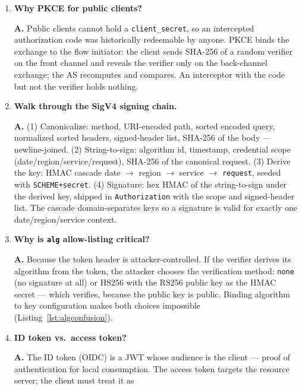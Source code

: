 \begin{enumerate}[label=\textbf{Q\arabic*.}, leftmargin=1.7cm, itemsep=0.9em, start=11]
  \item \textbf{Why PKCE for public clients?}\par
        \textbf{A.} Public clients cannot hold a \texttt{client\_secret}, so
        an intercepted authorization code was historically redeemable by
        anyone. PKCE binds the exchange to the flow initiator: the client
        sends SHA-256 of a random verifier on the front channel and reveals
        the verifier only on the back-channel exchange; the AS recomputes
        and compares. An interceptor with the code but not the verifier
        holds nothing.
  \item \textbf{Walk through the SigV4 signing chain.}\par
        \textbf{A.} (1) Canonicalize: method, URI-encoded path, sorted
        encoded query, normalized sorted headers, signed-header list,
        SHA-256 of the body --- newline-joined. (2) String-to-sign:
        algorithm id, timestamp, credential scope
        (date/region/service/request), SHA-256 of the canonical request.
        (3) Derive the key: HMAC cascade date $\rightarrow$ region
        $\rightarrow$ service $\rightarrow$ \texttt{request}, seeded with
        \texttt{SCHEME+secret}. (4) Signature: hex HMAC of the
        string-to-sign under the derived key, shipped in
        \texttt{Authorization} with the scope and signed-header list. The
        cascade domain-separates keys so a signature is valid for exactly
        one date/region/service context.
  \item \textbf{Why is \texttt{alg} allow-listing critical?}\par
        \textbf{A.} Because the token header is attacker-controlled. If the
        verifier derives its algorithm from the token, the attacker chooses
        the verification method: \texttt{none} (no signature at all) or
        HS256 with the RS256 public key as the HMAC secret --- which
        verifies, because the public key is public. Binding algorithm to key
        configuration makes both choices impossible
        (Listing~\ref{lst:algconfusion}).
  \item \textbf{ID token vs.\ access token?}\par
        \textbf{A.} The ID token (OIDC) is a JWT whose audience is the
        client --- proof of authentication for local consumption. The access
        token targets the resource server; the client must treat it as

\end{enumerate}
